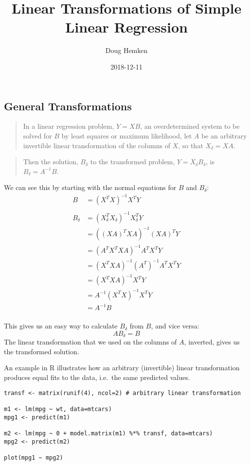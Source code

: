 \documentclass[]{article}
\title{Linear Transformations of Simple Linear Regression}
\author{Doug Hemken}
\date{2018-12-11}
\begin{document}
\maketitle

{
\setcounter{tocdepth}{2}
\tableofcontents
}
\hypertarget{general-transformations}{%
\subsection{General Transformations}\label{general-transformations}}

\begin{quote}
In a linear regression problem, \(Y=XB\), an overdetermined system to be
solved for \(B\) by least squares or maximum likelihood, let \(A\) be an
arbitrary invertible linear transformation of the columns of \(X\), so
that \(X_\delta=XA\).
\end{quote}

\begin{quote}
Then the solution, \(B_\delta\) to the transformed problem,
\(Y=X_\delta B_\delta\), is \(B_\delta=A^{-1}B\).
\end{quote}

We can see this by starting with the normal equations for \(B\) and
\(B_\delta\): \[\begin{aligned}B &=(X^TX)^{-1}X^TY \\
\\
 B_\delta &=(X_\delta^TX_\delta)^{-1}X_\delta^TY \\
 &=((XA)^TXA)^{-1}(XA)^TY \\
 &=(A^TX^TXA)^{-1}A^TX^TY \\
 &=(X^TXA)^{-1}(A^T)^{-1}A^TX^TY \\
 &=(X^TXA)^{-1}X^TY \\
 &=A^{-1}(X^TX)^{-1}X^TY \\
 &=A^{-1}B \\
\end{aligned}\]

This gives us an easy way to calculate \(B_\delta\) from \(B\), and vice
versa: \[AB_\delta=B\] The linear transformation that we used on the
columns of \(A\), inverted, gives us the transformed solution.

An example in R illustrates how an arbitrary (invertible) linear
transformation produces equal fits to the data, i.e.~the same predicted
values.

\begin{verbatim}
transf <- matrix(runif(4), ncol=2) # arbitrary linear transformation

m1 <- lm(mpg ~ wt, data=mtcars)
mpg1 <- predict(m1)

m2 <- lm(mpg ~ 0 + model.matrix(m1) %*% transf, data=mtcars)
mpg2 <- predict(m2)

plot(mpg1 ~ mpg2)
\end{verbatim}
\end{document}
